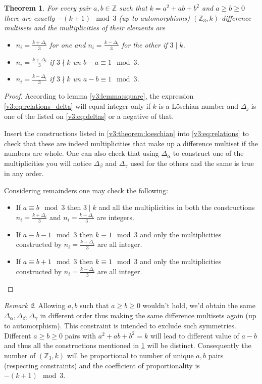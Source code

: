 \documentclass{article}
\theoremstyle{plain}
\newtheorem{theorem}{Theorem}[section]
\theoremstyle{definition}
\theoremstyle{remark}
\newtheorem{remark}[theorem]{Remark}
\begin{document}
		\begin{theorem}
			\label{v3:theorem:loeschian}
			For every pair $a,b \in \mathbb Z$ such that $k=a^2+ab+b^2$ and $a \geq b \geq 0$ there are exactly $-(k+1) \mod 3$ (up to automorphisms) $(\mathbb Z_3,k)$-difference multisets and the multiplicities of their elements are
			
			\begin{itemize}
				\item $n_i=\frac{k+\Delta_i}{3}$ for one and $n_i=\frac{k-\Delta_i}{3}$ for the other if $3 \mid k$.
				\item $n_i=\frac{k+\Delta_i}{3}$ if $3 \nmid k$ un $b-a \equiv 1 \mod 3$.
				\item $n_i=\frac{k-\Delta_i}{3}$ if $3 \nmid k$ un $a-b \equiv 1 \mod 3$.
			\end{itemize}
		\end{theorem}
		
		\begin{proof}
			According to lemma \ref{v3:lemma:square}, the expression \eqref{v3:eq:relations_delta} will equal integer only if $k$ is a Löschian number and $\Delta_j$ is one of the listed on \eqref{v3:eq:deltas} or a negative of that.
			
			Insert the constructions listed in \eqref{v3:theorem:loeschian} into \eqref{v3:eq:relations} to check that these are indeed multiplicities that make up a difference multiset if the numbers are whole. One can also check that using $\Delta_\alpha$ to construct one of the multiplicities you will notice $\Delta_\beta$ and $\Delta_\gamma$ used for the others and the same is true in any order.
			
			Considering remainders one may check the following:
			\begin{itemize}
				\item If $a \equiv b \mod 3$ then $3 \mid k$ and all the multiplicities in both the constructions $n_i=\frac{k+\Delta_i}{3}$ and $n_i=\frac{k-\Delta_i}{3}$ are integers.
				\item If $a \equiv b-1 \mod 3$ then $k \equiv 1 \mod 3$ and only the multiplicities constructed by $n_i=\frac{k+\Delta_i}{3}$ are all integer.
				\item If $a \equiv b+1 \mod 3$ then $k \equiv 1 \mod 3$ and only the multiplicities constructed by $n_i=\frac{k-\Delta_i}{3}$ are all integer.
			\end{itemize}
		\end{proof}

		\begin{remark}
			Allowing $a,b$ such that $a \geq b \geq 0$ wouldn't hold, we'd obtain the same $\Delta_\alpha, \Delta_\beta, \Delta_\gamma$ in different order thus making the same difference multisets again (up to automorphism). This constraint is intended to exclude such symmetries.
			Different $a \geq b \geq 0$ pairs with $a^2+ab+b^2=k$ will lead to different value of $a-b$ and thus all the constructions mentioned in \ref{v3:theorem:loeschian} will be distinct. Consequently the number of $(\mathbb Z_3,k)$ will be proportional to number of unique $a,b$ pairs (respecting constraints) and the coefficient of proportionality is $-(k+1) \mod 3$.
		\end{remark}
		
\end{document}
